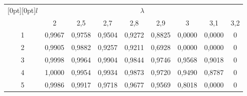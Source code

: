\begin{table}[h]\small
\vspace*{-12pt}
\begin{center}
\vspace*{1ex}

\tabcolsep=13pt
\begin{tabular}{|c|c|c|c|c|c|c|c|c|}
\hline
\multicolumn{1}{|c|}{\raisebox{-4pt}[0pt][0pt]{$l$}}& \multicolumn{8}{c|}{$\lambda$}\\
\cline{2-9}
&2&2,5&2,7&2,8&2,9&3&3,1&3,2\\
\hline
1&0,9967&0,9758&0,9504&0,9272&0,8825&0,0000&0,0000&0\\
2&0,9905&0,9882&0,9257&0,9211&0,6928&0,0000&0,0000&0\\
3&0,9998&0,9964&0,9904&0,9844&0,9746&0,9568&0,9018&0\\
4&1,0000&0,9954&0,9934&0,9873&0,9720&0,9490&0,8787&0\\
5&0,9986&0,9917&0,9718&0,9677&0,9569&0,8018&0,0000&0\\
     \hline
     \end{tabular}
     \end{center}
     \vspace*{4pt}
     \end{table}
     
